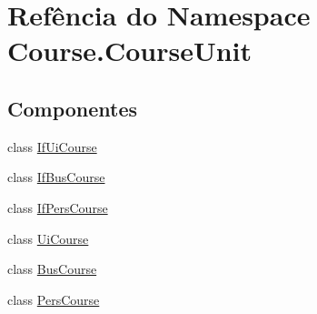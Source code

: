 \hypertarget{namespaceCourse_1_1CourseUnit}{\section{Refência do Namespace Course.\-Course\-Unit}
\label{df/d57/namespaceCourse_1_1CourseUnit}
}
\subsection*{Componentes}
\begin{DoxyCompactItemize}
\item 
class \hyperlink{classCourse_1_1CourseUnit_1_1IfUiCourse}{If\-Ui\-Course}
\item 
class \hyperlink{classCourse_1_1CourseUnit_1_1IfBusCourse}{If\-Bus\-Course}
\item 
class \hyperlink{classCourse_1_1CourseUnit_1_1IfPersCourse}{If\-Pers\-Course}
\item 
class \hyperlink{classCourse_1_1CourseUnit_1_1UiCourse}{Ui\-Course}
\item 
class \hyperlink{classCourse_1_1CourseUnit_1_1BusCourse}{Bus\-Course}
\item 
class \hyperlink{classCourse_1_1CourseUnit_1_1PersCourse}{Pers\-Course}
\end{DoxyCompactItemize}
